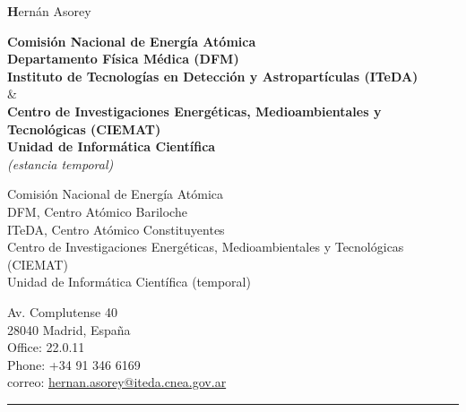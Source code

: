\documentclass[11pt, a4paper]{article}
\begin{document}
  \begin{center}{\huge \textbf Hernán Asorey}\\[1cm]\end{center}
  \begin{center}
	{\textbf{Comisión Nacional de Energía Atómica}}\\
	{\textbf{Departamento Física Médica (DFM)}}\\
	{\textbf{Instituto de Tecnologías en Detección y Astropartículas (ITeDA)}}\\
	\& \\
	{\textbf{Centro de Investigaciones Energéticas, Medioambientales y Tecnológicas (CIEMAT)}}\\
	{\textbf{Unidad de Informática Científica}}\\
	{\textit{(estancia temporal)}}\\
  \end{center}
  \begin{minipage}[t]{0.55\textwidth}
	Comisión Nacional de Energía Atómica\\
	\hspace*{1em}DFM, Centro Atómico Bariloche\\
	\hspace*{1em}ITeDA, Centro Atómico Constituyentes\\
 	Centro de Investigaciones Energéticas, Medioambientales y Tecnológicas (CIEMAT)\\
	\hspace*{1em}Unidad de Informática Científica (temporal)\\
  \end{minipage}\hspace*{0.02\textwidth}
  \begin{minipage}[t]{0.45\textwidth}
	Av. Complutense 40\\
	28040 Madrid, España\\
	Office: 22.0.11\\
	Phone: +34 91 346 6169\\
	correo: \href{mailto:hernan.asorey@iteda.cnea.gov.ar}{hernan.asorey@iteda.cnea.gov.ar}\\
  \end{minipage}
\hrule
\end{document}
